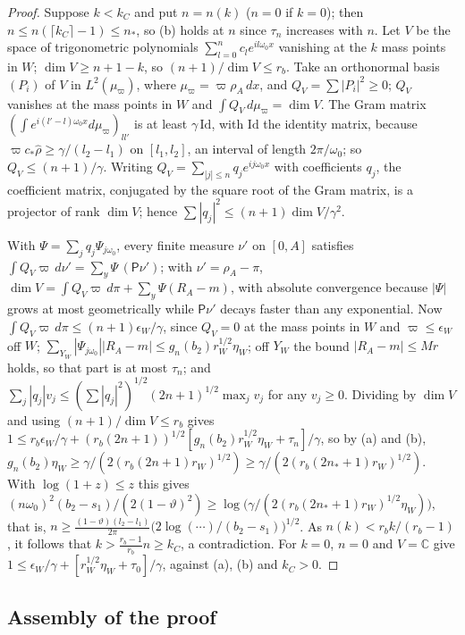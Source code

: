 \documentclass[10pt,letterpaper]{article}
\begin{document}
\begin{proof}
Suppose $k<k_C$ and put $n=n(k)$ ($n=0$ if $k=0$); then $n\le n(\lceil k_C\rceil-1)\le n_*$, so (b) holds at $n$ since $\tau_n$ increases
with $n$. Let $V$ be the space of trigonometric polynomials $\sum_{l=0}^nc_le^{il\omega_0x}$ vanishing at the $k$ mass points in $W$;
$\dim V\ge n+1-k$, so $(n+1)/\dim V\le r_b$. Take an orthonormal basis $(P_i)$ of $V$ in $L^2(\mu_\varpi)$, where $\mu_\varpi=\varpi\rho_A\,dx$, and
$Q_V=\sum|P_i|^2\ge0$; $Q_V$ vanishes at the mass points in $W$ and $\int Q_V\,d\mu_\varpi=\dim V$. The Gram matrix
$(\int e^{i(l'-l)\omega_0x}d\mu_\varpi)_{ll'}$ is at least $\gamma\,\mathrm{Id}$, with $\mathrm{Id}$ the identity matrix, because $\varpi c_*\hat\rho\ge\gamma/(l_2-l_1)$ on $[l_1,l_2]$, an
interval of length $2\pi/\omega_0$; so $Q_V\le(n+1)/\gamma$. Writing $Q_V=\sum_{|j|\le n}q_je^{ij\omega_0x}$ with coefficients $q_j$, the coefficient matrix,
conjugated by the square root of the Gram matrix, is a projector of rank $\dim V$; hence $\sum|q_j|^2\le(n+1)\dim V/\gamma^2$.

With $\Psi=\sum_jq_j\Psi_{j\omega_0}$, every finite measure $\nu'$ on $[0,A]$ satisfies $\int Q_V\varpi\,d\nu'=\sum_y\Psi\,(\mathsf P\nu')$; with
$\nu'=\rho_A-\pi$, $\dim V=\int Q_V\varpi\,d\pi+\sum_y\Psi(R_A-m)$, with absolute convergence because $|\Psi|$ grows at most geometrically
while $\mathsf P\nu'$ decays faster than any exponential. Now $\int Q_V\varpi\,d\pi\le(n+1)\epsilon_W/\gamma$, since $Q_V=0$ at the mass points
in $W$ and $\varpi\le\epsilon_W$ off $W$; $\sum_{Y_W}|\Psi_{j\omega_0}||R_A-m|\le g_n(b_2)r_W^{1/2}\eta_W$; off $Y_W$ the bound $|R_A-m|\le Mr$ holds, so
that part is at most $\tau_n$; and $\sum_j|q_j|v_j\le(\sum|q_j|^2)^{1/2}(2n+1)^{1/2}\max_jv_j$ for any $v_j\ge 0$. Dividing by $\dim V$ and using
$(n+1)/\dim V\le r_b$ gives $1\le r_b\epsilon_W/\gamma+(r_b(2n+1))^{1/2}[g_n(b_2)r_W^{1/2}\eta_W+\tau_n]/\gamma$, so by (a) and (b),
$g_n(b_2)\eta_W\ge\gamma/(2(r_b(2n+1)r_W)^{1/2})\ge\gamma/(2(r_b(2n_*+1)r_W)^{1/2})$. With $\log(1+z)\le z$ this gives $(n\omega_0)^2(b_2-s_1)/(2(1-\vartheta)^2)\ge\log\bigl(\gamma/(2(r_b(2n_*+1)r_W)^{1/2}\eta_W)\bigr)$, that is,
$n\ge\frac{(1-\vartheta)(l_2-l_1)}{2\pi}\bigl(2\log(\cdots)/(b_2-s_1)\bigr)^{1/2}$. As $n(k)<r_bk/(r_b-1)$, it follows that $k>\frac{r_b-1}{r_b}n\ge k_C$, a contradiction. For $k=0$, $n=0$ and $V=\mathbb C$ give
$1\le\epsilon_W/\gamma+[r_W^{1/2}\eta_W+\tau_0]/\gamma$, against (a), (b) and $k_C>0$.
\end{proof}

\subsection{Assembly of the proof}\label{app:C-proof}
\end{document}
